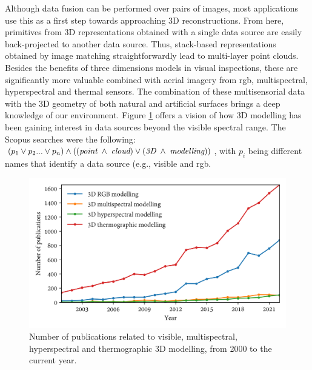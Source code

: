 Although data fusion can be performed over pairs of images, most applications use this as a first step towards approaching 3D reconstructions. From here, primitives from 3D representations obtained with a single data source are easily back-projected to another data source. Thus, stack-based representations obtained by image matching straightforwardly lead to multi-layer point clouds. Besides the benefits of three dimensions models in visual inspections, these are significantly more valuable combined with aerial imagery from \acrshort{rgb}, multispectral, hyperspectral and thermal sensors. The combination of these multisensorial data with the 3D geometry of both natural and artificial surfaces brings a deep knowledge of our environment. Figure \ref{fig:scopus_point_clouds} offers a vision of how 3D modelling has been gaining interest in data sources beyond the visible spectral range. The Scopus searches were the following: $(p_1 \lor p_2 ... \lor p_n) \land ((\textit{point} \hspace{1mm} \land \hspace{1mm} \textit{cloud}) \lor (\textit{3D} \hspace{1mm} \land \hspace{1mm} \textit{modelling}))$, with $p_i$ being different names that identify a data source (e.g., visible and \acrshort{rgb}.

\begin{figure}[ht]
    \centering
    \includegraphics[width=\linewidth]{figs/context/3d_modelling.png}
	\caption{Number of publications related to visible, multispectral, hyperspectral and thermographic 3D modelling, from 2000 to the current year. }
	\label{fig:scopus_point_clouds}
\end{figure}

